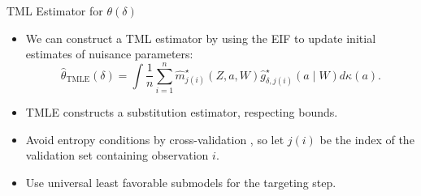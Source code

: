 \documentclass{beamer}
\begin{document}

\begin{frame}[c]{TML Estimator for $\theta(\delta)$}

\begin{center}
\begin{itemize}
\itemsep2pt
\item We can construct a TML estimator by using the EIF to update initial
  estimates of nuisance parameters:
    \begin{equation*}
      \hat{\theta}_{\text{TMLE}}(\delta) = \int \frac{1}{n} \sum_{i=1}^n
      \hat{m}^{\star}_{j(i)}(Z, a, W)
      \hat{g}_{\delta, j(i)}^{\star}(a \mid W) d\kappa(a).
    \end{equation*}
  \item TMLE constructs a substitution estimator, respecting bounds.
  \item Avoid entropy conditions by cross-validation \citep{zheng2011cross,
    chernozhukov2016double}, so let $j(i)$ be the index of the validation set
    containing observation $i$.
  \item Use universal least favorable submodels \citep{vdl2016one} for the
    targeting step.
\end{itemize}
\end{center}

\note{
}

\end{frame}

\end{document}
